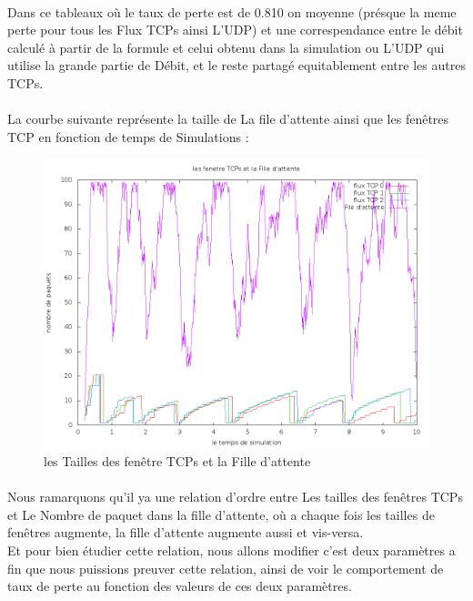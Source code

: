 \documentclass[a4paper]{report}
\theoremstyle{definition}
\begin{document}
\paragraph*{} Dans ce tableaux où le taux de perte est de 0.810 on moyenne (présque la meme perte pour tous les Flux TCPs ainsi L'UDP) et une correspendance entre le débit calculé à partir de la formule et celui obtenu dans la simulation ou L'UDP qui utilise la grande partie de Débit, et le reste partagé equitablement entre les autres TCPs.
  
\paragraph*{} La courbe suivante représente la taille de La file d'attente ainsi que les fenêtres TCP en fonction de temps de Simulations : \\
\begin{figure}[h]
	\centering
		\includegraphics[width=450px]{graphic/tp.png}
		\caption{les Tailles des fenêtre TCPs et la Fille d'attente}
\end{figure}

\paragraph*{} Nous ramarquons qu'il ya une relation d'ordre entre Les tailles des fenêtres TCPs et Le Nombre de paquet dans la fille d'attente, où a chaque fois les tailles de fenêtres augmente, la fille d'attente augmente aussi et vis-versa.\\

      Et pour bien étudier cette relation, nous allons modifier c'est deux paramètres a fin que nous  puissions preuver cette relation, ainsi de voir le comportement de taux de perte au fonction des valeurs de ces deux paramètres.   
\end{document}
